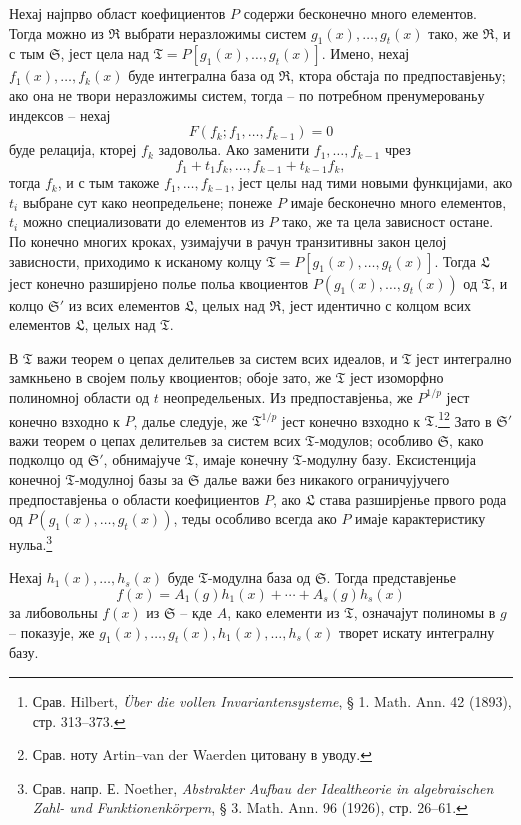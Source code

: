﻿\documentclass[11pt]{article}
\begin{document}
Нехај најпрво област коефициентов $P$ содержи бесконечно много елементов. Тогда можно из $\mathfrak R$ выбрати неразложимы систем $g_1(x),\ldots,g_t(x)$ тако, же $\mathfrak R$, и с тым $\mathfrak S$, јест цела над $\mathfrak T=P[g_1(x),\ldots,g_t(x)]$. Имено, нехај $f_1(x),\ldots,f_k(x)$ буде интегрална база од $\mathfrak R$, ктора обстаја по предпоставјеньу; ако она не твори неразложимы систем, тогда -- по потребном пренумерованьу индексов -- нехај
\[
F(f_k;f_1,\ldots,f_{k-1})=0
\]
буде релација, ктореј $f_k$ задовольа. Ако заменити $f_1,\ldots,f_{k-1}$ чрез
\[
 f_1+t_1f_k,\ldots,f_{k-1}+t_{k-1}f_k,
\]
тогда $f_k$, и с тым такоже $f_1,\ldots,f_{k-1}$, јест целы над тими новыми функцијами, ако $t_i$ выбране сут како неопредельене; понеже $P$ имаје бесконечно много елементов, $t_i$ можно специализовати до елементов из $P$ тако, же та цела зависност остане. По конечно многих кроках, узимајучи в рачун транзитивны закон целој зависности, приходимо к исканому колцу $\mathfrak T=P[g_1(x),\ldots,g_t(x)]$. Тогда $\mathfrak L$ јест конечно разширјено полье польа квоциентов $P(g_1(x),\ldots,g_t(x))$ од $\mathfrak T$, и колцо $\mathfrak S'$ из всих елементов $\mathfrak L$, целых над $\mathfrak R$, јест идентично с колцом всих елементов $\mathfrak L$, целых над $\mathfrak T$.

В $\mathfrak T$ важи теорем о цепах делительев за систем всих идеалов, и $\mathfrak T$ јест интегрално замкньено в својем польу квоциентов; обоје зато, же $\mathfrak T$ јест изоморфно полиномној области од $t$ неопредельеных. Из предпоставјеньа, же $P^{1/p}$ јест конечно взходно к $P$, далье следује, же $\mathfrak T^{1/p}$ јест конечно взходно к $\mathfrak T$.\footnote{Срав. Hilbert, \emph{Über die vollen Invariantensysteme}, § 1. Math. Ann. 42 (1893), стр. 313--373.}\footnote{Срав. ноту Artin--van der Waerden цитовану в уводу.} Зато в $\mathfrak S'$ важи теорем о цепах делительев за систем всих $\mathfrak T$-модулов; особливо $\mathfrak S$, како подколцо од $\mathfrak S'$, обнимајуче $\mathfrak T$, имаје конечну $\mathfrak T$-модулну базу. Ексистенција конечној $\mathfrak T$-модулној базы за $\mathfrak S$ далье важи без никакого ограничујучего предпоставјеньа о области коефициентов $P$, ако $\mathfrak L$ става разширјенье првого рода од $P(g_1(x),\ldots,g_t(x))$, теды особливо всегда ако $P$ имаје карактеристику нульа.\footnote{Срав. напр. Е. Noether, \emph{Abstrakter Aufbau der Idealtheorie in algebraischen Zahl- und Funktionenkörpern}, § 3. Math. Ann. 96 (1926), стр. 26--61.}

Нехај $h_1(x),\ldots,h_s(x)$ буде $\mathfrak T$-модулна база од $\mathfrak S$. Тогда представјенье
\[
 f(x)=A_1(g)h_1(x)+\cdots+A_s(g)h_s(x)
\]
за либовольны $f(x)$ из $\mathfrak S$ -- кде $A$, како елементи из $\mathfrak T$, означајут полиномы в $g$ -- показује, же $g_1(x),\ldots,g_t(x),h_1(x),\ldots,h_s(x)$ творет искату интегралну базу.
\end{document}
